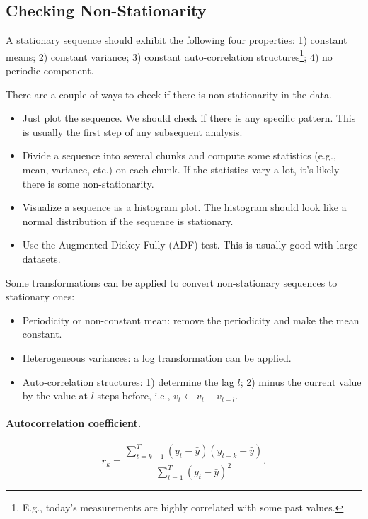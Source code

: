 


\subsection{Checking Non-Stationarity}
A stationary sequence should exhibit the following four properties: 1) constant means; 2) constant variance; 3) constant auto-correlation structures\footnote{E.g., today's measurements are highly correlated with some past values.}; 4) no periodic component. 

There are a couple of ways to check if there is non-stationarity in the data.
    \begin{itemize}
        \item Just plot the sequence. We should check if there is any specific pattern. 
        This is usually the first step of any subsequent analysis.
        \item Divide a sequence into several chunks and compute some statistics (e.g., mean, variance, etc.) on each chunk. 
        If the statistics vary a lot, it's likely there is some non-stationarity. 
        \item Visualize a sequence as a histogram plot. The histogram should look like a normal distribution if the sequence is stationary.
        \item Use the Augmented Dickey-Fully (ADF) test. This is usually good with large datasets.
    \end{itemize}

Some transformations can be applied to convert non-stationary sequences to stationary ones:
    \begin{itemize}
        \item Periodicity or non-constant mean: remove the periodicity and make the mean constant.
        \item Heterogeneous variances: a log transformation can be applied.
        \item Auto-correlation structures: 1) determine the lag $l$; 2) minus the current value by the value at $l$ steps before, i.e., $v_t \leftarrow v_t - v_{t-l}$.
    \end{itemize}


\paragraph{Autocorrelation coefficient.}
    \begin{equation}
        r_k = \frac{\sum_{t=k+1}^{T}{(y_t - \bar{y})(y_{t-k} - \bar{y})}}{\sum_{t=1}^{T}{(y_t - \bar{y})^2}}.
    \end{equation}


